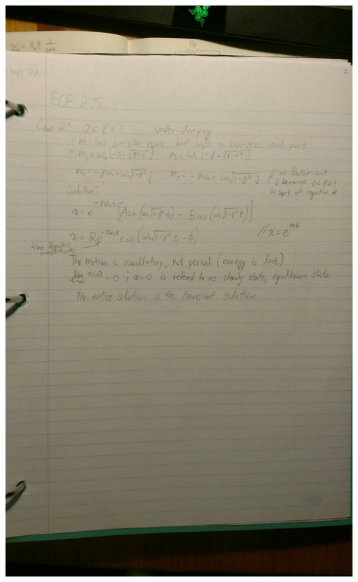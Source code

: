 \documentclass[11pt]{article}
\theoremstyle{definition}
\begin{document}
\includegraphics[width=\textwidth,height=\textheight,keepaspectratio]{friday/3.jpg}\\
\end{document}
